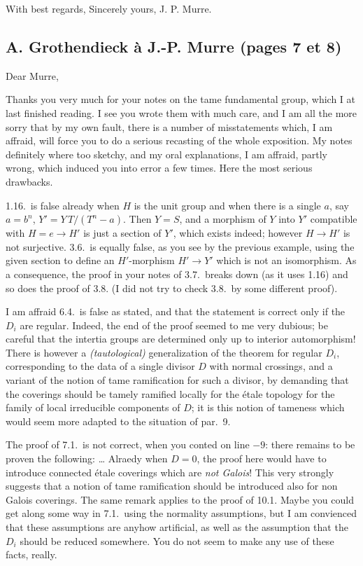 \documentclass[11pt,a4paper]{article}
\begin{document}
With best regards, Sincerely yours, J. P. Murre.

\subsection*{A. Grothendieck à J.-P. Murre (pages 7 et 8)}

Dear Murre,

Thanks you very much for your notes on the tame fundamental group, which I at
last finished reading. I see you wrote them with much care, and I am all the
more sorry that by my own fault, there is a number of misstatements which, I am
affraid, will force you to do a serious recasting of the whole exposition. My
notes definitely where too sketchy, and my oral explanations, I am affraid,
partly wrong, which induced you into error a few times. Here the most serious
drawbacks.

1.16.\ is false already when $H$ is the unit group and when there is a single
$a$, say $a = b^{n}$, $Y' = Y\,T/(T^{n}-a)$. Then $Y = S$, and a morphism of
$Y$ into $Y'$ compatible with $H = e \to H'$ is just a section of $Y'$, which
exists indeed; however $H \to H'$ is not surjective. 3.6.\ is equally false, as
you see by the previous example, using the given section to define an
$H'$-morphism $H' \to Y'$ which is not an isomorphism. As a consequence, the
proof in your notes of 3.7.\ breaks down (as it uses 1.16) and so does the
proof of 3.8. (I did not try to check 3.8.\ by some different proof).

I am affraid  6.4.\ is false as stated, and that the
statement is correct only if the $D_i$ are regular. Indeed, the end of the
proof seemed to me very dubious; be careful that the intertia groups are
determined only up to interior automorphism! There is however a
\emph{(tautological)} generalization of the theorem for regular $D_i$,
corresponding to the data of a single divisor $D$ with normal crossings, and a
variant of the notion of tame ramification for such a divisor, by demanding
that the coverings should be tamely ramified locally for the étale topology for
the family of local irreducible components of $D$; it is this notion of
tameness which would seem more adapted to the situation of par.\ 9.

The proof of 7.1.\ is not correct, when you conted on line $-9$: there remains
to be proven the following: … Alraedy when $D=0$, the proof here would
have to introduce connected étale coverings which are \emph{not Galois}! This
very strongly suggests that a notion of tame ramification should be introduced
also  for non Galois coverings. The same remark applies to the proof
of 10.1. Maybe you could get along some way in 7.1.\ using the normality
assumptions, but I am convienced that these assumptions are anyhow artificial,
as well as the assumption that the $D_i$ should be reduced somewhere. You do
not seem to make any use of these facts, really.
\end{document}
